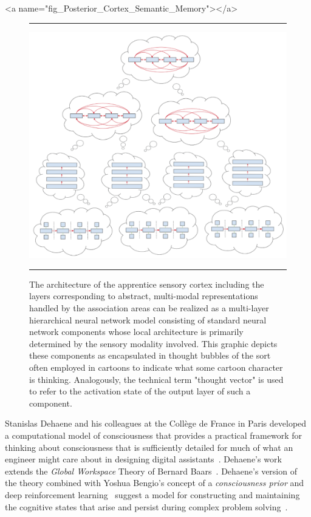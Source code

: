 \rawhtml
<a name="fig_Posterior_Cortex_Semantic_Memory"></a>
\endrawhtml
\begin{figure}
%
  \hrule{}
%
  \begin{center} 
    \includegraphics[width=550pt]{./figures/Posterior_Cortex_Semantic_Memory.png} %
  \end{center}
%
  \caption{The architecture of the apprentice sensory cortex including the layers corresponding to abstract, multi-modal representations handled by the association areas can be realized as a multi-layer hierarchical neural network model consisting of standard neural network components whose local architecture is primarily determined by the sensory modality involved. This graphic depicts these components as encapsulated in thought bubbles of the sort often employed in cartoons to indicate what some cartoon character is thinking. Analogously, the technical term "thought vector" is used to refer to the activation state of the output layer of such a component.}
%
  \hrule{}
%
\end{figure}


Stanislas Dehaene and his colleagues at the Coll\`{e}ge de France in Paris developed a computational model of consciousness that provides a practical framework for thinking about consciousness that is sufficiently detailed for much of what an engineer might care about in designing digital assistants~\cite{Dehaene2014}. Dehaene’s work extends the {\it{Global Workspace}} Theory of Bernard Baars~\cite{Baars1988}. Dehaene’s version of the theory combined with Yoshua Bengio’s concept of a {\it{consciousness prior}} and deep reinforcement learning~\cite{MnihetalCoRR-13,NairetalCoRR-15} suggest a model for constructing and maintaining the cognitive states that arise and persist during complex problem solving~\cite{BengioCoRR-17}.

